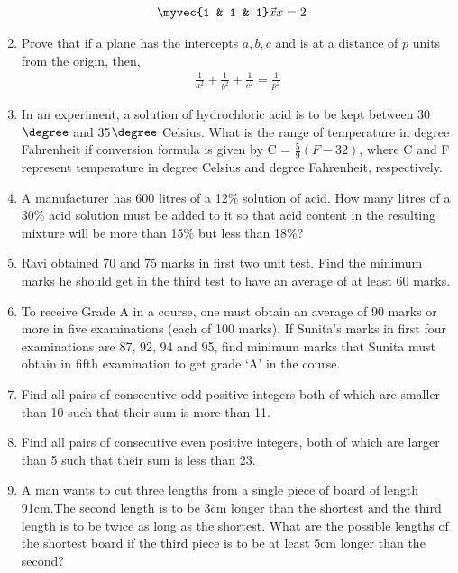 \begin{enumerate}[label=\arabic*.,ref=\thesubsection.\theenumi]
\begin{align}
\myvec{1 & 1 & 1}\vec{x}{x}&=2
\end{align}
%
\item Prove that if a plane has the intercepts $a, b, c$ and is at a distance of $p$ units from the origin, then, 
\begin{align}
\frac{1}{a^2}+\frac{1}{b^2}+\frac{1}{c^2}=\frac{1}{p^2} 
\end{align}
     \item In an experiment, a solution of hydrochloric acid is to be kept between 30$\degree$ and 35$\degree$ Celsius. What is the range of temperature in degree Fahrenheit if conversion formula is given by 
     C = $\frac{5}{9}(F-32)$, where C and F represent temperature in degree Celsius and degree Fahrenheit, respectively.
     \item A manufacturer has 600 litres of a 12$\%$ solution of acid. How many litres of a 30$\%$ acid solution must be added to it so that acid content in the resulting mixture will be more than 15$\%$ but less than 18$\%$?
    \item Ravi obtained 70 and 75 marks in first two unit test. Find the minimum marks he should get in the third test to have an average of at least 60 marks.
    \item To receive Grade A in a course, one must obtain an average of 90 marks or more in five examinations (each of 100 marks). If Sunita’s marks in first four examinations are 87, 92, 94 and 95, find minimum marks that Sunita must obtain in fifth examination to get grade ‘A’ in the course.
    \item Find all pairs of consecutive odd positive integers both of which are smaller than 10 such that their sum is more than 11.
    \item Find all pairs of consecutive even positive integers, both of which are larger than 5 such that their sum is less than 23.
    \item A man wants to cut three lengths from a single piece of board of length 91cm.The second length is to be 3cm longer than the shortest and the third length is to be twice as long as the shortest. What are the possible lengths of the shortest board if the third piece is to be at least 5cm longer than the second?
%
\end{enumerate}
